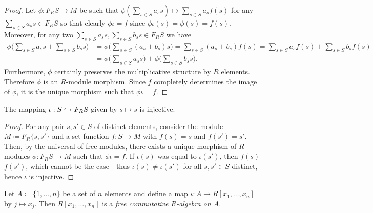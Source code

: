 \begin{proof}
    Let \(\phi: F_R S \to M\) be such that
    \(\phi(\sum_{s \in S} a_s s) \mapsto \sum_{s \in S} a_s f(s)\) for any
    \(\sum_{s \in S} a_s s \in F_R S\) so that clearly \(\phi \iota = f\) since
    \(\phi \iota(s) = \phi(s) = f(s)\). Moreover, for any two
    \(\sum_{s \in S} a_s s, \sum_{s \in S} b_s s \in F_R S\) we have
    \begin{align*}
        \phi\bigg( \sum_{s \in S} a_s s + \sum_{s \in S} b_s s \bigg)
         & = \phi\bigg( \sum_{s \in S} (a_s + b_s) s \bigg)
        = \sum_{s \in S} (a_s + b_s) f(s)
        = \sum_{s \in S} a_s f(s) + \sum_{s \in S} b_s f(s) \\
         & = \phi\bigg( \sum_{s \in S} a_s s \bigg)
        + \phi\bigg( \sum_{s \in S} b_s s \bigg).
    \end{align*}
    Furthermore, \(\phi\) certainly preserves the multiplicative structure by \(R\)
    elements. Therefore \(\phi\) is an \(R\)-module morphism. Since \(f\) completely
    determines the image of \(\phi\), it is the unique morphism such that
    \(\phi \iota = f\).
\end{proof}

\begin{corollary}
    \label{cor:set-to-module-injective}
    The mapping \(\iota: S \hookrightarrow F_R S\) given by \(s \mapsto s\) is injective.
\end{corollary}

\begin{proof}
    For any pair \(s, s' \in S\) of distinct elements, consider the module
    \(M \coloneq F_R \{s, s'\}\) and a set-function \(f: S \to M\) with \(f(s) = s\)
    and \(f(s') = s'\). Then, by the universal of free modules, there exists a
    unique morphism of \(R\)-modules \(\phi: F_R S \to M\) such that \(\phi \iota =
    f\). If \(\iota(s)\) was equal to \(\iota(s')\), then \(f(s)\) \(f(s')\), which
    cannot be the case---thus \(\iota(s) \neq \iota(s')\) for all \(s, s' \in S\)
    distinct, hence \(\iota\) is injective.
\end{proof}

\begin{proposition}
    \label{prop:ring-poly-is-free-commutative-R-algebra}
    Let \(A \coloneq \{1, \dots, n\}\) be a set of \(n\) elements and define a map
    \(\iota: A \to R[x_1, \dots, x_n]\) by \(j \mapsto x_j\). Then \(R[x_1, \dots,
            x_n]\) is a \emph{free commutative \(R\)-algebra on \(A\)}.
\end{proposition}

